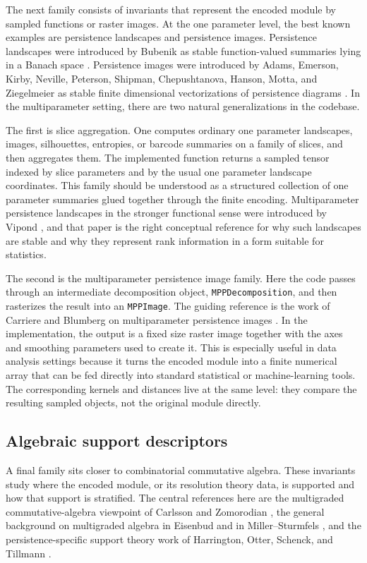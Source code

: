 \documentclass[11pt]{article}
\theoremstyle{definition}
\theoremstyle{remark}
\begin{document}
The next family consists of invariants that represent the encoded module by sampled functions or raster images. At the one parameter level, the best known examples are persistence landscapes and persistence images. Persistence landscapes were introduced by Bubenik as stable function-valued summaries lying in a Banach space \cite{Bub15}.  Persistence images were introduced by Adams, Emerson, Kirby, Neville, Peterson, Shipman, Chepushtanova, Hanson, Motta, and Ziegelmeier as stable finite dimensional vectorizations of persistence diagrams \cite{AEK17}.  In the multiparameter setting, there are two natural generalizations in the codebase.

The first is slice aggregation.  One computes ordinary one parameter landscapes, images, silhouettes, entropies, or barcode summaries on a family of slices, and then aggregates them.  The implemented function returns a sampled tensor indexed by slice parameters and by the usual one parameter landscape coordinates.  This family should be understood as a structured collection of one parameter summaries glued together through the finite encoding.  Multiparameter persistence landscapes in the stronger functional sense were introduced by Vipond \cite{Vip20}, and that paper is the right conceptual reference for why such landscapes are stable and why they represent rank information in a form suitable for statistics.

The second is the multiparameter persistence image family. Here the code passes through an intermediate decomposition object, \texttt{MPPDecomposition}, and then rasterizes the result into an \texttt{MPPImage}.  The guiding reference is the work of Carriere and Blumberg on multiparameter persistence images \cite{CB20}.  In the implementation, the output is a fixed size raster image together with the axes and smoothing parameters used to create it.  This is especially useful in data analysis settings because it turns the encoded module into a finite numerical array that can be fed directly into standard statistical or machine-learning tools.  The corresponding kernels and distances live at the same level: they compare the resulting sampled objects, not the original module directly.

\subsection{Algebraic support descriptors}

A final family sits closer to combinatorial commutative algebra.  These invariants study where the encoded module, or its resolution theory data, is supported and how that support is stratified.  The central references here are the multigraded commutative-algebra viewpoint of Carlsson and Zomorodian \cite{CZ09}, the general background on multigraded algebra in Eisenbud and in Miller--Sturmfels \cite{Eis95,MS05}, and the persistence-specific support theory work of Harrington, Otter, Schenck, and Tillmann \cite{HOST19}.
\end{document}

